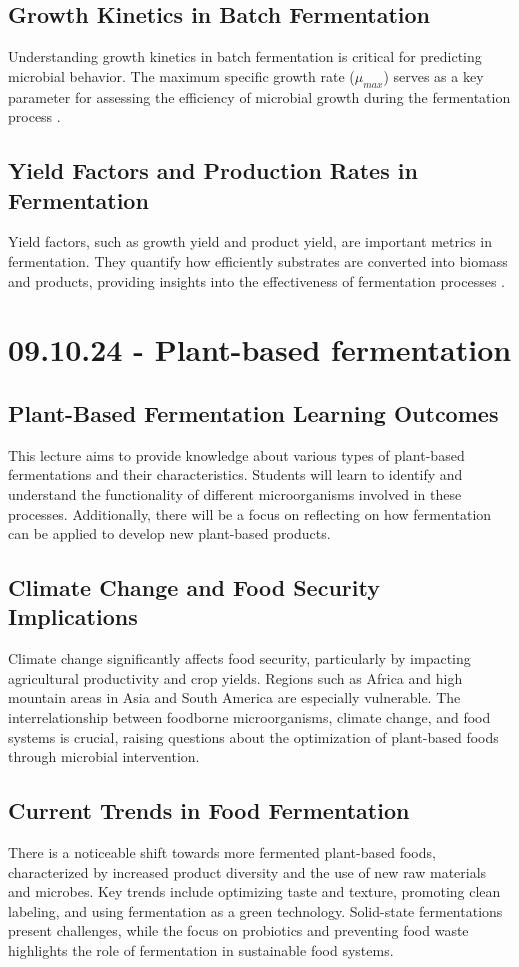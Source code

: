 \subsection{Growth Kinetics in Batch Fermentation}
Understanding growth kinetics in batch fermentation is critical for predicting microbial behavior. The maximum specific growth rate ($\mu_{max}$) serves as a key parameter for assessing the efficiency of microbial growth during the fermentation process \cite*{L11-MicroGrow}.

\subsection{Yield Factors and Production Rates in Fermentation}
Yield factors, such as growth yield and product yield, are important metrics in fermentation. They quantify how efficiently substrates are converted into biomass and products, providing insights into the effectiveness of fermentation processes \cite*{L11-MicroGrow}.

\section{09.10.24 - Plant-based fermentation}
\subsection{Plant-Based Fermentation Learning Outcomes} 
This lecture aims to provide knowledge about various types of plant-based fermentations and their characteristics. Students will learn to identify and understand the functionality of different microorganisms involved in these processes. Additionally, there will be a focus on reflecting on how fermentation can be applied to develop new plant-based products.

\subsection{Climate Change and Food Security Implications} 
Climate change significantly affects food security, particularly by impacting agricultural productivity and crop yields. Regions such as Africa and high mountain areas in Asia and South America are especially vulnerable. The interrelationship between foodborne microorganisms, climate change, and food systems is crucial, raising questions about the optimization of plant-based foods through microbial intervention.

\subsection{Current Trends in Food Fermentation} 
There is a noticeable shift towards more fermented plant-based foods, characterized by increased product diversity and the use of new raw materials and microbes. Key trends include optimizing taste and texture, promoting clean labeling, and using fermentation as a green technology. Solid-state fermentations present challenges, while the focus on probiotics and preventing food waste highlights the role of fermentation in sustainable food systems.

